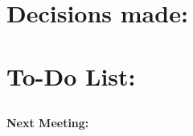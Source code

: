 \documentclass{article}
\newenvironment{myindentpar}[1]%
 {\begin{list}{}%
         {\setlength{\leftmargin}{#1}}%
         \item[]%
 }
 {\end{list}}
\begin{document}
\section{\LARGE Decisions made:}
	\subsection{}
		\begin{myindentpar}{1cm} 
		
		\end{myindentpar}


\section{\LARGE To-Do List: }
	\subsection{}
		\begin{myindentpar}{1cm} 
		
		\end{myindentpar}
	


\begin {center}
{\Large \textbf{Next Meeting: }}
\end{center}
\end{document}
